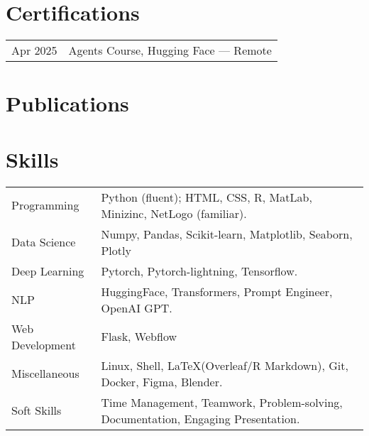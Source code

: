 \documentclass[a4paper,12pt]{article}
\begin{document}
\section{Certifications}
\begin{tabularx}{\linewidth}{@{}l X@{}}
Apr 2025 & Agents Course, Hugging Face — Remote \\
\end{tabularx}

\section{Publications}
\begin{refsection}
\nocite{*}
\printbibliography[heading=none]
\end{refsection}

\section{Skills}
\begin{tabularx}{\linewidth}{@{}l X@{}}
Programming &  \normalsize{Python (fluent); HTML, CSS, R, MatLab, Minizinc, NetLogo (familiar).}\\
Data Science  &  \normalsize{Numpy, Pandas, Scikit-learn, Matplotlib, Seaborn, Plotly}\\  
Deep Learning  &  \normalsize{Pytorch, Pytorch-lightning, Tensorflow.}\\  
NLP  &  \normalsize{HuggingFace, Transformers, Prompt Engineer, OpenAI GPT.}\\  
Web Development  &  \normalsize{Flask, Webflow}\\  
Miscellaneous  &  \normalsize{Linux, Shell, \LaTeX (Overleaf/R Markdown), Git, Docker, Figma, Blender.}\\  
Soft Skills  &  \normalsize{Time Management, Teamwork, Problem-solving, Documentation, Engaging Presentation.}\\  
\end{tabularx}
\end{document}
